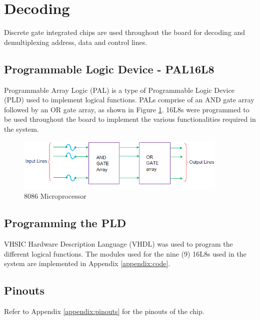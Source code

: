 \newpage
\section{Decoding}
Discrete gate integrated chips are used throughout the board for decoding and demultiplexing address, data and control lines.

    \subsection{Programmable Logic Device - PAL16L8}
    Programmable Array Logic (PAL) is a type of Programmable Logic Device (PLD) used to implement logical functions. \cite{pal} PALs comprise of an AND gate array followed by an OR gate array, as shown in Figure \ref{fig:pal}.\n
    16L8s were programmed to be used throughout the board to implement the various functionalities required in the system.

        \begin{figure}[h]
            \begin{center}
                \includegraphics[width=0.9\textwidth]{figures/pal.png}
                \caption{8086 Microprocessor} \label{fig:pal}
            \end{center}
        \end{figure}


    \subsection{Programming the PLD}
    VHSIC Hardware Description Language (VHDL) was used to program the different logical functions. The modules used for the nine (9) 16L8s used in the system are implemented in Appendix \ref{appendix:code}.

    \subsection{Pinouts}
    Refer to Appendix \ref{appendix:pinouts} for the pinouts of the chip.
